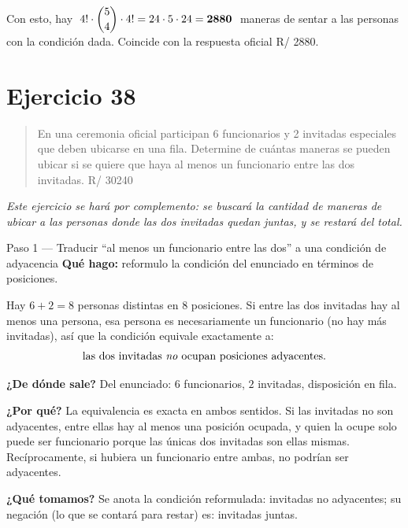 \documentclass[11pt]{article}
\begin{document}
\begin{resp}
Con esto, hay $\;4!\cdot\dbinom{5}{4}\cdot 4! = 24\cdot 5\cdot 24=\mathbf{2880}\;$ maneras de sentar a las personas con la condición dada. Coincide con la respuesta oficial R/ 2880.
\end{resp}

\section*{Ejercicio 38}

\begin{quote}
En una ceremonia oficial participan 6 funcionarios y 2 invitadas especiales que deben ubicarse en una fila. Determine de cuántas maneras se pueden ubicar si se quiere que haya al menos un funcionario entre las dos invitadas. \hfill R/ 30240
\end{quote}

\emph{Este ejercicio se hará por complemento: se buscará la cantidad de maneras de ubicar a las personas donde las dos invitadas quedan juntas, y se restará del total.}

\begin{paso}{Paso 1 --- Traducir ``al menos un funcionario entre las dos'' a una condición de adyacencia}
\textbf{Qué hago:} reformulo la condición del enunciado en términos de posiciones.

Hay $6+2=8$ personas distintas en $8$ posiciones. Si entre las dos invitadas hay al menos una persona, esa persona es necesariamente un funcionario (no hay más invitadas), así que la condición equivale exactamente a:
\[
  \text{las dos invitadas \emph{no} ocupan posiciones adyacentes.}
\]

\textbf{¿De dónde sale?} Del enunciado: $6$ funcionarios, $2$ invitadas, disposición en fila.

\textbf{¿Por qué?} La equivalencia es exacta en ambos sentidos. Si las invitadas no son adyacentes, entre ellas hay al menos una posición ocupada, y quien la ocupe solo puede ser funcionario porque las únicas dos invitadas son ellas mismas. Recíprocamente, si hubiera un funcionario entre ambas, no podrían ser adyacentes.

\textbf{¿Qué tomamos?} Se anota la condición reformulada: invitadas no adyacentes; su negación (lo que se contará para restar) es: invitadas juntas.
\end{paso}
\end{document}
